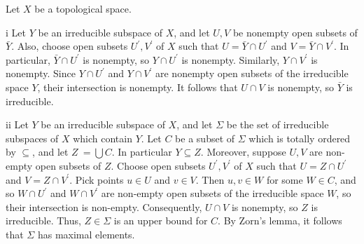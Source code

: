 \begin{exercise}
Let \(X\) be a topological space.
\end{exercise}

\begin{partsolution}{i}
Let \(Y\) be an irreducible subspace of \(X\), and let \(U, V\) be nonempty open subsets of \(\bar{Y}\).
Also, choose open subsets \(U^\prime, V^\prime\) of \(X\) such that \(U = \bar{Y} \cap U^\prime\) and \(V = \bar{Y} \cap V^\prime\).
In particular, \(\bar{Y} \cap U^\prime\) is nonempty, so \(Y \cap U^\prime\) is nonempty.
Similarly, \(Y \cap V^\prime\) is nonempty.
Since \(Y \cap U^\prime\) and \(Y \cap V^\prime\) are nonempty open subsets of the irreducible space \(Y\), their intersection is nonempty.
It follows that \(U \cap V\) is nonempty, so \(\bar{Y}\) is irreducible.
\end{partsolution}

\begin{partsolution}{ii}
Let \(Y\) be an irreducible subspace of \(X\), and let \(\Sigma\) be the set of irreducible subspaces of \(X\) which contain \(Y\).
Let \(C\) be a subset of \(\Sigma\) which is totally ordered by \(\subseteq\), and let \(Z \ = \bigcup C\).
In particular \(Y \subseteq Z\).
Moreover, suppose \(U, V\) are non-empty open subsets of \(Z\).
Choose open subsets \(U^\prime, V^\prime\) of \(X\) such that \(U = Z \cap U^\prime\) and \(V = Z \cap V^\prime\).
Pick points \(u \in U\) and \(v \in V\).
Then \(u, v \in W\) for some \(W \in C\), and so \(W \cap U^\prime\) and \(W \cap V^\prime\) are non-empty open subsets of the irreducible space \(W\), so their intersection is non-empty.
Consequently, \(U \cap V\) is nonempty, so \(Z\) is irreducible.
Thus, \(Z \in \Sigma\) is an upper bound for \(C\).
By Zorn's lemma, it follows that \(\Sigma\) has maximal elements.
\end{partsolution}

